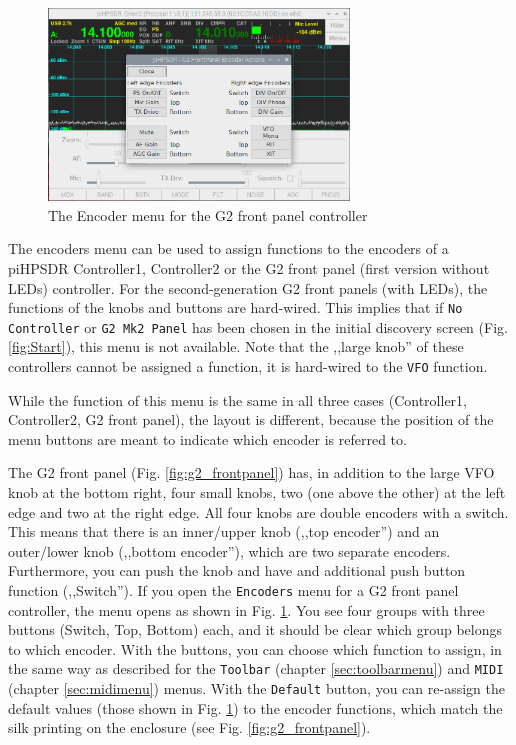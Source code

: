 \documentclass[12pt]{book}
\def\rett#1{\texttt{\color{red}#1}}
\def\bltt#1{\texttt{\color{blue}#1}}
\def\pH{pi\-HPSDR }
\begin{document}
\begin{figure}[ht]
\center
\includegraphics[width=8cm]{EncoderMenuG2.png}
\caption{The Encoder menu for the G2 front panel controller}
\label{fig:EncoderMenuG2}
\end{figure}
The encoders menu can be used to assign functions to the encoders of a
\pH Controller1, Controller2 or the G2 front panel (first version without LEDs)
controller. For the second-generation G2 front panels (with LEDs), the functions
of the knobs and buttons are hard-wired.
This implies that if \texttt{No Controller} or \texttt{G2 Mk2 Panel} has been chosen
in the initial discovery screen
(Fig. \ref{fig:Start}), this menu is not available.
Note that the ,,large knob'' of these controllers
cannot be assigned a function, it is hard-wired to the \bltt{VFO} function.



While the function of this menu is the same in all three cases (Controller1, Controller2,
G2 front panel), the layout is different, because the position of the menu buttons
are meant to indicate which encoder is referred to.



The G2 front panel (Fig. \ref{fig:g2_frontpanel}) has,
in addition to the large VFO knob at the bottom right,
four small knobs, two (one above the other)
at the left edge and two at the right edge. All four knobs are double encoders with
a switch. This means that there is an inner/upper knob (,,top encoder'')
and an outer/lower knob (,,bottom encoder''), which
are two separate encoders. Furthermore, you can push the knob and have and additional
push button function (,,Switch''). If you open the \bltt{Encoders} menu for
a G2 front panel controller, the menu opens as shown in Fig. \ref{fig:EncoderMenuG2}.
You see four groups with three buttons (Switch, Top, Bottom) each, and it should be
clear which group belongs to which encoder. With the buttons, you can choose which function
to assign, in the same way as described for the \bltt{Toolbar} (chapter \ref{sec:toolbarmenu})
and \bltt{MIDI} (chapter \ref{sec:midimenu}) menus. With the \rett{Default} button, you can
re-assign the default values (those shown in Fig. \ref{fig:EncoderMenuG2})
to the encoder functions, which match the silk printing
on the enclosure (see Fig. \ref{fig:g2_frontpanel}).
\end{document}
